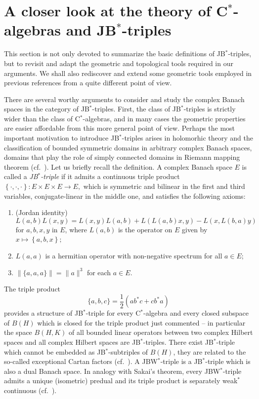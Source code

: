 \documentclass[10pt]{amsart}
\def\J#1#2#3{ \left\{ #1,#2,#3 \right\} }
\begin{document}
	\section{A closer look at the theory of C$^*$-algebras and JB$^*$-triples}\label{subsect:JBstar}
	
	This section is not only devoted to summarize the basic definitions of JB$^*$-triples, but to revisit and adapt the geometric and topological tools required in our arguments. We shall also rediscover and extend some geometric tools employed in previous references from a quite different point of view.
	
	There are several worthy arguments to consider and study the complex Banach spaces in the category of JB$^*$-triples. First, the class of JB$^*$-triples is strictly wider than the class of C$^*$-algebras, and in many cases the geometric properties are easier affordable from this more general point of view. Perhaps the most important motivation to introduce JB$^*$-triples arises in holomorhic theory and the classification of bounded symmetric domains in arbitrary complex Banach spaces, domains that play the role of simply connected domains in Riemann mapping theorem (cf.\ \cite{Ka83}). Let us briefly recall the definition. A complex Banach space $E$ is called a \emph{JB$^*$-triple} if it admits a continuous triple product $\J \cdot\cdot\cdot\colon
	E\times E\times E \longrightarrow E,$ which is symmetric and bilinear in the first and third variables, conjugate-linear in the middle one,
	and satisfies the following axioms:
	\begin{enumerate}[{\rm (a)}] \item (Jordan identity)
		$$L(a,b) L(x,y) = L(x,y) L(a,b) + L(L(a,b)x,y)
		- L(x,L(b,a)y)$$ for $a,b,x,y$ in $E$, where $L(a,b)$ is the operator on $E$ given by $x \longmapsto \J abx;$
		\item $L(a,a)$ is a hermitian operator with non-negative spectrum for all $a\in E$;
		\item $\|\{a,a,a\}\| = \|a\|^3$ for each $a\in E$.
\end{enumerate}
	
The triple product \begin{equation}\label{eq C* triple product} \{a,b,c\} = \frac12 ( ab^* c + c b^* a)
\end{equation} provides a structure of JB$^*$-triple for every C$^*$-algebra and every closed subspace of $B(H)$ which is closed for the triple product just commented -- in particular the space $B(H,K)$ of all bounded linear operators between two complex Hilbert spaces and all complex Hilbert spaces are JB$^*$-triples. There exist JB$^*$-triple which cannot be embedded as JB$^*$-subtriples of $B(H)$, they are related to the so-called exceptional Cartan factors (cf.\ \cite{FriRu86}). A JBW$^*$-triple is a JB$^*$-triple which is also a dual Banach space. In analogy with Sakai's theorem, every JBW$^*$-triple admits a unique (isometric) predual and its triple product is separately weak$^*$ continuous (cf.\ \cite{BarTi}).
	
\end{document}
